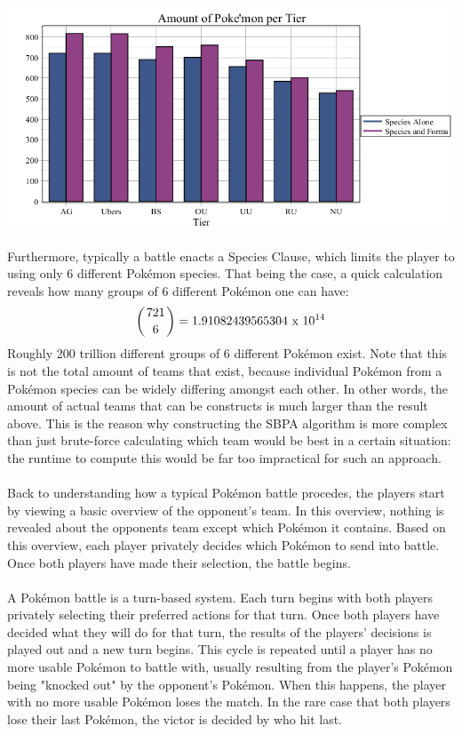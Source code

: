 \documentclass{article}
\begin{document}
\begin{center}
	\includegraphics[width=\textwidth]{TierAmount.png}\label{TierAmountGraph}
\end{center}
Furthermore, typically a battle enacts a Species Clause, which limits the player to using only 6 different Pok\'emon species. That being the case, a quick calculation reveals how many groups of 6 different Pok\'emon one can have:
\begin{equation*}
	\left({721 \above 0pt 6}\right)=1.91082439565304\text{ x }10^{14}
\end{equation*}
Roughly 200 trillion different groups of 6 different Pok\'emon exist. Note that this is not the total amount of teams that exist, because individual Pok\'emon from a Pok\'emon species can be widely differing amongst each other. In other words, the amount of actual teams that can be constructs is much larger than the result above. This is the reason why constructing the SBPA algorithm is more complex than just brute-force calculating which team would be best in a certain situation: the runtime to compute this would be far too impractical for such an approach.\\\\
Back to understanding how a typical Pok\'emon battle procedes, the players start by viewing a basic overview of the opponent's team. In this overview, nothing is revealed about the opponents team except which Pok\'emon it contains. Based on this overview, each player privately decides which Pok\'emon to send into battle. Once both players have made their selection, the battle begins.\\\\
A Pok\'emon battle is a turn-based system. Each turn begins with both players privately selecting their preferred actions for that turn. Once both players have decided what they will do for that turn, the results of the players' decisions is played out and a new turn begins. This cycle is repeated until a player has no more usable Pok\'emon to battle with, usually resulting from the player's Pok\'emon being "knocked out" by the opponent's Pok\'emon. When this happens, the player with no more usable Pok\'emon loses the match. In the rare case that both players lose their last Pok\'emon, the victor is decided by who hit last.\\\\
\end{document}
